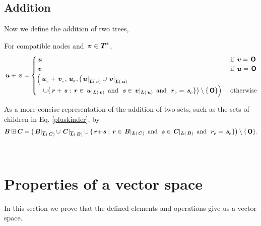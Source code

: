 \subsection{Addition}
Now we define the addition of two trees,
\begin{definition}\label{treeaddition}
  For compatible nodes  and \(\node{v} \in \DOMstar\), 
  \begin{align}
      \node{u} + \node{v} = \begin{cases}
        \node{u} &\text{ if } \node{v} = \zerotree\notag\\
        \node{v} &\text{ if } \node{u} = \zerotree\notag\\
        \Bigl(\nv{u} + \nv{v}, \nlabel{u}, 
        \bigl(\nrestrictedto{u}{v}\cup\nrestrictedto{v}{u} & {} \\
        \quad\cup\{\node{r}+\node{s}:\node{r}\in\restrictedto{u}{v}\mand\node{s}\in\restrictedto{v}{u}\mand\nlabel{r}=\nlabel{s}\}\bigr)\setminus \{\zerotree\}\Bigr) & \text{ otherwise}
      \end{cases}
  \end{align}
\end{definition}

\begin{definition}[Notation]
  As a more concise representation of the addition of two sets, such
  as the sets of children in Eq. \ref{pluskinder}, by
  \begin{align*}
      \set{B}\stplus\set{C} = \childO{B}{C}{r}{s}{+}.
  \end{align*}
\end{definition}
\


\section{Properties of a vector space}
In this section we prove that the defined elements and operations give
us a vector space.  

